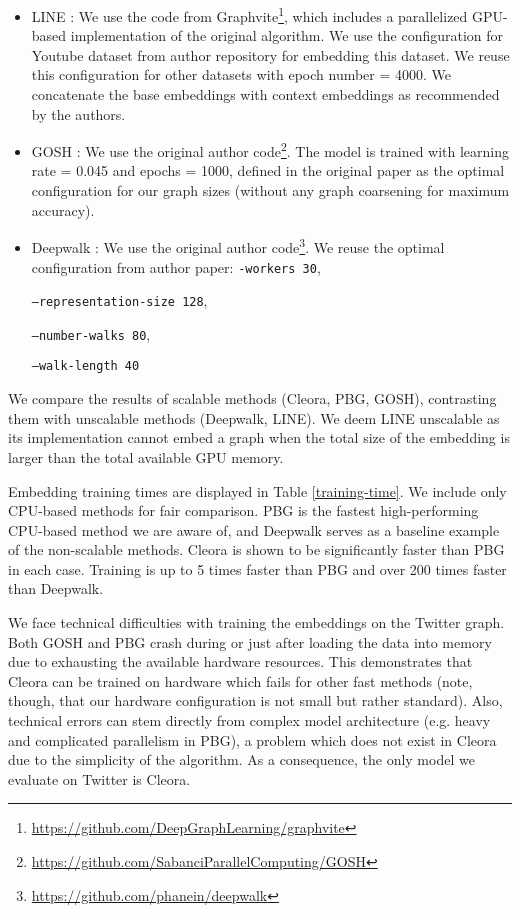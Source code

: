 \documentclass{IEEEtran}
\begin{document}
\begin{itemize}
    \item LINE \cite{tang2015line}: We use the code from Graphvite\footnote{\url{https://github.com/DeepGraphLearning/graphvite}}, which includes a parallelized GPU-based implementation of the original algorithm. We use the configuration for Youtube dataset from author repository for embedding this dataset. We reuse this configuration for other datasets with epoch number  = 4000. We concatenate the base embeddings with context embeddings as recommended by the authors.
    \item GOSH \cite{10.1145/3404397.3404456}: We use the original author code\footnote{\url{https://github.com/SabanciParallelComputing/GOSH}}. The model is trained with learning rate  = 0.045 and epochs  = 1000, defined in the original paper as the optimal configuration for our graph sizes (without any graph coarsening for maximum accuracy). 
\item Deepwalk \cite{perozzi2014deepwalk}: We use the original author code\footnote{\url{https://github.com/phanein/deepwalk}}. We reuse the optimal configuration from author paper: 
    \texttt{-workers 30},
    
    \texttt{--representation-size 128},
    
    \texttt{--number-walks 80},
    
    \texttt{--walk-length 40}

\end{itemize}

We compare the results of scalable methods (Cleora, PBG, GOSH), contrasting them with unscalable methods (Deepwalk, LINE). We deem LINE unscalable as its implementation cannot embed a graph when the total size of the embedding is larger than the total available GPU memory.

Embedding training times are displayed in Table \ref{training-time}. We include only CPU-based methods for fair comparison. PBG is the fastest high-performing CPU-based method we are aware of, and Deepwalk serves as a baseline example of the non-scalable methods. Cleora is shown to be significantly faster than PBG in each case. Training is up to 5 times faster than PBG and over 200 times faster than Deepwalk.

We face technical difficulties with training the embeddings on the Twitter graph. Both GOSH and PBG crash during or just after  loading the data into memory due to exhausting the available hardware resources.
This demonstrates that Cleora can be trained on hardware which fails for other fast methods (note, though, that our hardware configuration is not small but rather standard). Also, technical errors can stem directly from complex model architecture (e.g. heavy and complicated parallelism in PBG), a problem which does not exist in Cleora due to the simplicity of the algorithm. As a consequence, the only model we evaluate on Twitter is Cleora. 
\end{document}
